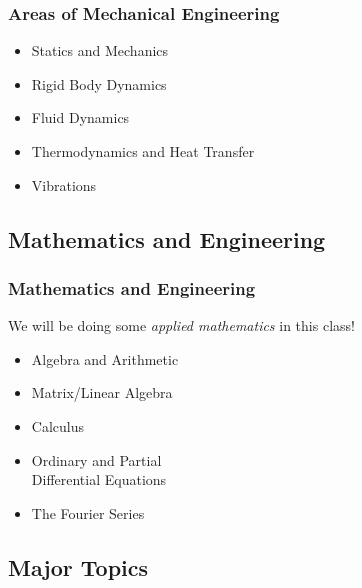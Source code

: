 \documentclass[fleqn]{beamer} %
\newcommand{\sectionIsubsectionIItitle}{Areas of Mechanical Engineering}
\newcommand{\sectionIsubsectionIIItitle}{Mathematics and Engineering}
\newcommand{\sectionIsubsectionIVtitle}{Major Topics}
\begin{document}
			\begin{frame}
				\frametitle{\sectionIsubsectionIItitle}
				\bigskip

				\begin{itemize}
					\item Statics and Mechanics\\
					\item Rigid Body Dynamics\\
					\item Fluid Dynamics\\
					\item Thermodynamics and Heat Transfer\\
					\item Vibrations\\
				\end{itemize}  

				\btVFill
			\end{frame}

		\subsection{\sectionIsubsectionIIItitle}\label{sectionIsubsectionIII}
			\begin{frame} 
				\frametitle{\sectionIsubsectionIIItitle}
				\bigskip

				We will be doing some {\it applied mathematics} in this class!
				\begin{multicols}{2}
				\begin{itemize}
					\item Algebra and Arithmetic\\
					\item Matrix\slash Linear Algebra \\
					\item Calculus \\
					\item Ordinary and Partial \\Differential Equations \\
					\item The Fourier Series \\
				\end{itemize}
				\end{multicols} 

				\btVFill
			\end{frame}	

		\subsection{\sectionIsubsectionIVtitle}\label{sectionIsubsectionIV}	
\end{document}

